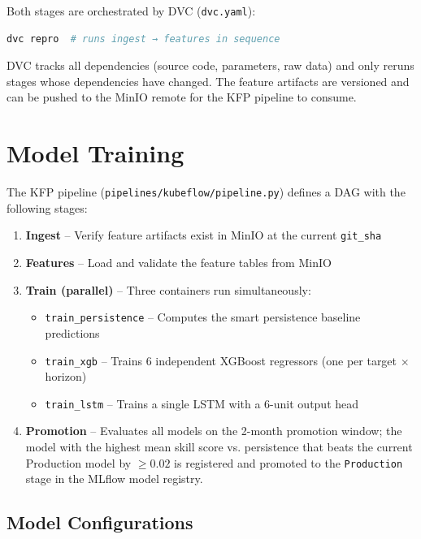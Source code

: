 \documentclass[11pt,a4paper]{article}
\begin{document}
Both stages are orchestrated by DVC (\texttt{dvc.yaml}):

\begin{lstlisting}[language=bash]
dvc repro  # runs ingest → features in sequence
\end{lstlisting}

DVC tracks all dependencies (source code, parameters, raw data) and only reruns stages whose dependencies have changed. The feature artifacts are versioned and can be pushed to the MinIO remote for the KFP pipeline to consume.

\section{Model Training}

The KFP pipeline (\texttt{pipelines/kubeflow/pipeline.py}) defines a DAG with the following stages:

\begin{enumerate}
    \item \textbf{Ingest}  --  Verify feature artifacts exist in MinIO at the current \texttt{git\_sha}
    \item \textbf{Features}  --  Load and validate the feature tables from MinIO
    \item \textbf{Train (parallel)}  --  Three containers run simultaneously:
    \begin{itemize}
        \item \texttt{train\_persistence}  --  Computes the smart persistence baseline predictions
        \item \texttt{train\_xgb}  --  Trains 6 independent XGBoost regressors (one per target $\times$ horizon)
        \item \texttt{train\_lstm}  --  Trains a single LSTM with a 6-unit output head
    \end{itemize}
    \item \textbf{Promotion}  --  Evaluates all models on the 2-month promotion window; the model with the highest mean skill score vs. persistence that beats the current Production model by $\geq 0.02$ is registered and promoted to the \texttt{Production} stage in the MLflow model registry.
\end{enumerate}

\subsection{Model Configurations}
\end{document}
